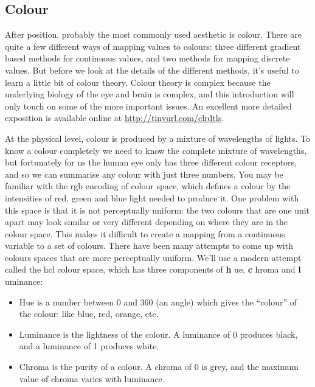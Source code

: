 \subsection{Colour}\label{sub:scale-colour}

After position, probably the most commonly used aesthetic is colour.
There are quite a few different ways of mapping values to colours: three
different gradient based methods for continuous values, and two methods
for mapping discrete values. But before we look at the details of the
different methods, it's useful to learn a little bit of colour theory.
Colour theory is complex because the underlying biology of the eye and
brain is complex, and this introduction will only touch on some of the
more important issues. An excellent more detailed exposition is
available online at \url{http://tinyurl.com/clrdtls}. 

At the physical level, colour is produced by a mixture of wavelengths of
lights. To know a colour completely we need to know the complete mixture
of wavelengths, but fortunately for us the human eye only has three
different colour receptors, and so we can summarise any colour with just
three numbers. You may be familiar with the rgb encoding of colour
space, which defines a colour by the intensities of red, green and blue
light needed to produce it. One problem with this space is that it is
not perceptually uniform: the two colours that are one unit apart may
look similar or very different depending on where they are in the colour
space. This makes it difficult to create a mapping from a continuous
variable to a set of colours. There have been many attempts to come up
with colours spaces that are more perceptually uniform. We'll use a
modern attempt called the hcl colour space, which has three components
of \textbf{h} ue, \textbf{c} hroma and \textbf{l} uminance:

\begin{itemize}
\itemsep1pt\parskip0pt
\item
  Hue is a number between 0 and 360 (an angle) which gives the
  ``colour'' of the colour: like blue, red, orange, etc.
\item
  Luminance is the lightness of the colour. A luminance of 0 produces
  black, and a luminance of 1 produces white.
\item
  Chroma is the purity of a colour. A chroma of 0 is grey, and the
  maximum value of chroma varies with luminance.
\end{itemize}


